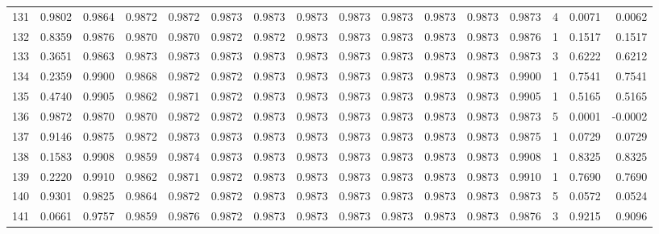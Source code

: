 \begin{tabular}{lrrrrrrrrrrrrrrr}
131 &      0.9802 &  0.9864 &  0.9872 &  0.9872 &  0.9873 &  0.9873 &  0.9873 &  0.9873 &  0.9873 &  0.9873 &   0.9873 &     0.9873 &      4 &                    0.0071 &                     0.0062 \\
132 &      0.8359 &  0.9876 &  0.9870 &  0.9870 &  0.9872 &  0.9872 &  0.9873 &  0.9873 &  0.9873 &  0.9873 &   0.9873 &     0.9876 &      1 &                    0.1517 &                     0.1517 \\
133 &      0.3651 &  0.9863 &  0.9873 &  0.9873 &  0.9873 &  0.9873 &  0.9873 &  0.9873 &  0.9873 &  0.9873 &   0.9873 &     0.9873 &      3 &                    0.6222 &                     0.6212 \\
134 &      0.2359 &  0.9900 &  0.9868 &  0.9872 &  0.9872 &  0.9873 &  0.9873 &  0.9873 &  0.9873 &  0.9873 &   0.9873 &     0.9900 &      1 &                    0.7541 &                     0.7541 \\
135 &      0.4740 &  0.9905 &  0.9862 &  0.9871 &  0.9872 &  0.9873 &  0.9873 &  0.9873 &  0.9873 &  0.9873 &   0.9873 &     0.9905 &      1 &                    0.5165 &                     0.5165 \\
136 &      0.9872 &  0.9870 &  0.9870 &  0.9872 &  0.9872 &  0.9873 &  0.9873 &  0.9873 &  0.9873 &  0.9873 &   0.9873 &     0.9873 &      5 &                    0.0001 &                    -0.0002 \\
137 &      0.9146 &  0.9875 &  0.9872 &  0.9873 &  0.9873 &  0.9873 &  0.9873 &  0.9873 &  0.9873 &  0.9873 &   0.9873 &     0.9875 &      1 &                    0.0729 &                     0.0729 \\
138 &      0.1583 &  0.9908 &  0.9859 &  0.9874 &  0.9873 &  0.9873 &  0.9873 &  0.9873 &  0.9873 &  0.9873 &   0.9873 &     0.9908 &      1 &                    0.8325 &                     0.8325 \\
139 &      0.2220 &  0.9910 &  0.9862 &  0.9871 &  0.9872 &  0.9873 &  0.9873 &  0.9873 &  0.9873 &  0.9873 &   0.9873 &     0.9910 &      1 &                    0.7690 &                     0.7690 \\
140 &      0.9301 &  0.9825 &  0.9864 &  0.9872 &  0.9872 &  0.9873 &  0.9873 &  0.9873 &  0.9873 &  0.9873 &   0.9873 &     0.9873 &      5 &                    0.0572 &                     0.0524 \\
141 &      0.0661 &  0.9757 &  0.9859 &  0.9876 &  0.9872 &  0.9873 &  0.9873 &  0.9873 &  0.9873 &  0.9873 &   0.9873 &     0.9876 &      3 &                    0.9215 &                     0.9096 \\

\end{tabular}
